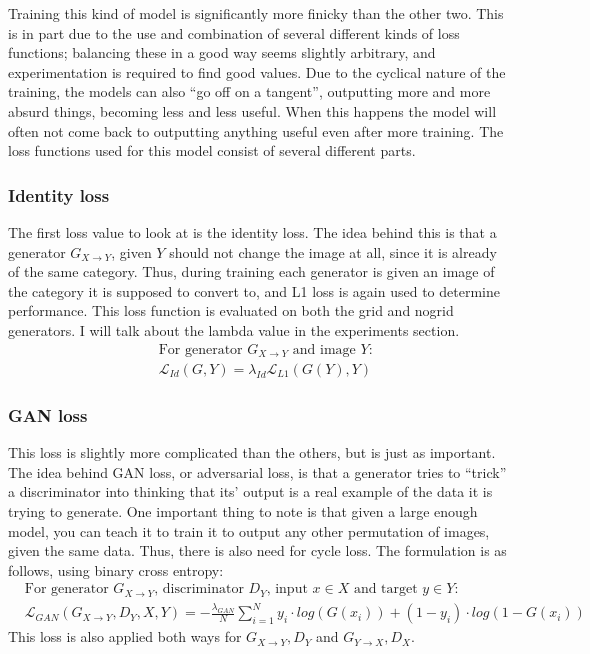 Training this kind of model is significantly more finicky than the other two. This is in part due to the use and combination of several different kinds of loss functions; balancing these in a good way seems slightly arbitrary, and experimentation is required to find good values. Due to the cyclical nature of the training, the models can also ``go off on a tangent'', outputting more and more absurd things, becoming less and less useful. When this happens the model will often not come back to outputting anything useful even after more training. The loss functions used for this model consist of several different parts.

\subsubsection{Identity loss}
The first loss value to look at is the identity loss. The idea behind this is that a generator $G_{X\rightarrow Y}$, given $Y$ should not change the image at all, since it is already of the same category. Thus, during training each generator is given an image of the category it is supposed to convert to, and L1 loss is again used to determine performance. This loss function is evaluated on both the grid and nogrid generators. I will talk about the lambda value in the experiments section.
\begin{align}
  &\text{For generator $G_{X\rightarrow Y}$ and image $Y$:} \nonumber\\
  &\mathcal{L}_{Id}(G,Y) = \lambda_{Id} \mathcal{L}_{L1}\left(G(Y),Y\right)\label{eq:idlambda}
\end{align}

\subsubsection{GAN loss}
This loss is slightly more complicated than the others, but is just as important. The idea behind GAN loss, or adversarial loss, is that a generator tries to ``trick'' a discriminator into thinking that its' output is a real example of the data it is trying to generate. One important thing to note is that given a large enough model, you can teach it to train it to output any other permutation of images, given the same data. Thus, there is also need for cycle loss. The formulation is as follows, using binary cross entropy:
\begin{align}
  &\text{For generator $G_{X\rightarrow Y}$, discriminator $D_Y$, input $x \in X$ and target $y \in Y$:} \nonumber\\
  &\mathcal{L}_{GAN}(G_{X\rightarrow Y},D_Y,X,Y) = -\frac{\lambda_{GAN}}{N} \sum_{i=1}^N y_i \cdot log\left(G(x_i)\right) + (1-y_i) \cdot log\left(1-G(x_i)\right)\label{eq:ganlambda}
\end{align}
This loss is also applied both ways for $G_{X\rightarrow Y}, D_Y$ and $G_{Y\rightarrow X}, D_X$.

